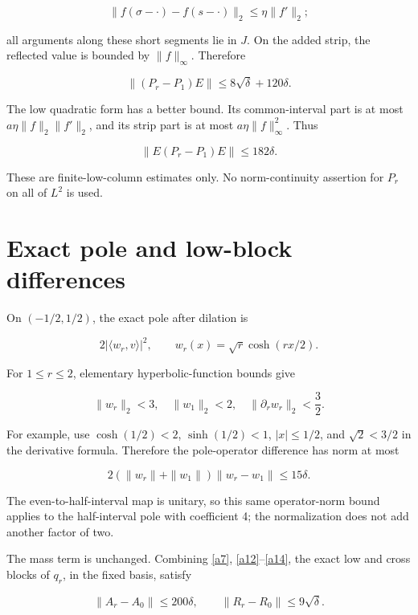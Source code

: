 \documentclass[11pt]{article}
\begin{document}
\[
\|f(\sigma-\cdot)-f(s-\cdot)\|_2\le\eta\|f'\|_2;
\]

all arguments along these short segments lie in \(J\). On the added strip, the reflected value is bounded by \(\|f\|_\infty\). Therefore

\begin{equation}\label{a12}
\|(P_r-P_1)E\|
 \le8\sqrt\delta+120\delta.
\end{equation}

The low quadratic form has a better bound. Its common-interval part is at most
\(a\eta\|f\|_2\|f'\|_2\), and its strip part is at most
\(a\eta\|f\|_\infty^2\). Thus

\begin{equation}\label{a13}
\|E(P_r-P_1)E\|\le182\delta.
\end{equation}

These are finite-low-column estimates only. No norm-continuity assertion for \(P_r\) on all of \(L^2\) is used.

\section{Exact pole and low-block differences}

On \((-1/2,1/2)\), the exact pole after dilation is

\[
2|\langle w_r,v\rangle|^2,
\qquad w_r(x)=\sqrt r\cosh(rx/2).
\]

For \(1\le r\le2\), elementary hyperbolic-function bounds give

\[
\|w_r\|_2<3,\quad \|w_1\|_2<2,
\quad \|\partial_r w_r\|_2<\frac32.
\]

For example, use \(\cosh(1/2)<2\), \(\sinh(1/2)<1\), \(|x|\le1/2\), and \(\sqrt2<3/2\) in the derivative formula. Therefore the pole-operator difference has norm at most

\begin{equation}\label{a14}
2(\|w_r\|+\|w_1\|)\|w_r-w_1\|\le15\delta.
\end{equation}

The even-to-half-interval map is unitary, so this same operator-norm bound applies to the half-interval pole with coefficient 4; the normalization does not add another factor of two.

The mass term is unchanged. Combining \eqref{a7}, \eqref{a12}--\eqref{a14}, the exact low and cross blocks of \(q_r\), in the fixed basis, satisfy

\begin{equation}\label{a15}
\boxed{\|A_r-A_0\|\le200\delta,\qquad
       \|R_r-R_0\|\le9\sqrt\delta.}
\end{equation}
\end{document}
